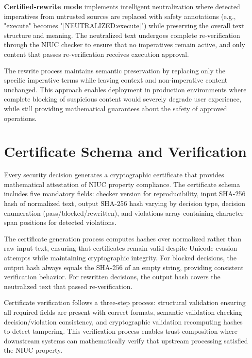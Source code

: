 \textbf{Certified-rewrite mode} implements intelligent neutralization where detected imperatives from untrusted sources are replaced with safety annotations (e.g., "execute" becomes "[NEUTRALIZED:execute]") while preserving the overall text structure and meaning. The neutralized text undergoes complete re-verification through the NIUC checker to ensure that no imperatives remain active, and only content that passes re-verification receives execution approval.

The rewrite process maintains semantic preservation by replacing only the specific imperative terms while leaving context and non-imperative content unchanged. This approach enables deployment in production environments where complete blocking of suspicious content would severely degrade user experience, while still providing mathematical guarantees about the safety of approved operations.

\section{Certificate Schema and Verification}

Every security decision generates a cryptographic certificate that provides mathematical attestation of NIUC property compliance. The certificate schema includes five mandatory fields: checker version for reproducibility, input SHA-256 hash of normalized text, output SHA-256 hash varying by decision type, decision enumeration (pass/blocked/rewritten), and violations array containing character span positions for detected violations.

The certificate generation process computes hashes over normalized rather than raw input text, ensuring that certificates remain valid despite Unicode evasion attempts while maintaining cryptographic integrity. For blocked decisions, the output hash always equals the SHA-256 of an empty string, providing consistent verification behavior. For rewritten decisions, the output hash covers the neutralized text that passed re-verification.

Certificate verification follows a three-step process: structural validation ensuring all required fields are present with correct formats, semantic validation checking decision/violation consistency, and cryptographic validation recomputing hashes to detect tampering. This verification process enables trust composition where downstream systems can mathematically verify that upstream processing satisfied the NIUC property.

